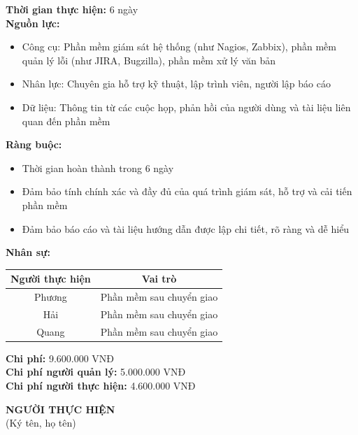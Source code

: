 {\begin{minipage}{\textwidth}
    \noindent \textbf{Thời gian thực hiện:} 6 ngày \\
    \noindent \textbf{Nguồn lực:}
    \begin{itemize}
        \item Công cụ: Phần mềm giám sát hệ thống (như Nagios, Zabbix), phần mềm quản lý lỗi (như JIRA, Bugzilla), phần mềm xử lý văn bản
        \item Nhân lực: Chuyên gia hỗ trợ kỹ thuật, lập trình viên, người lập báo cáo
        \item Dữ liệu: Thông tin từ các cuộc họp, phản hồi của người dùng và tài liệu liên quan đến phần mềm
    \end{itemize}
    \vspace{0.5cm}
    \noindent \textbf{Ràng buộc:}
    \begin{itemize}
        \item Thời gian hoàn thành trong 6 ngày
        \item Đảm bảo tính chính xác và đầy đủ của quá trình giám sát, hỗ trợ và cải tiến phần mềm
        \item Đảm bảo báo cáo và tài liệu hướng dẫn được lập chi tiết, rõ ràng và dễ hiểu
    \end{itemize}
    \vspace{0.5cm}
    \noindent \textbf{Nhân sự:}
    \begin{longtable}{|c|c|}
    \hline
    \textbf{Người thực hiện} & \textbf{Vai trò} \\
    \hline
    Phương & Phần mềm sau chuyển giao \\
    Hải & Phần mềm sau chuyển giao \\
    Quang & Phần mềm sau chuyển giao \\
    \hline
    \end{longtable}
    \vspace{0.5cm}
    \noindent \textbf{Chi phí:} 9.600.000 VNĐ \\
    \noindent \textbf{Chi phí người quản lý:} 5.000.000 VNĐ \\
    \noindent \textbf{Chi phí người thực hiện:} 4.600.000 VNĐ \\
    \vspace{1cm}
    \begin{flushleft}
        \hspace{8cm} \textbf{NGƯỜI THỰC HIỆN} \\
        \hspace{8.8cm} (Ký tên, họ tên) \\
        \vspace{1cm}
    \end{flushleft}
    \end{minipage}
}

